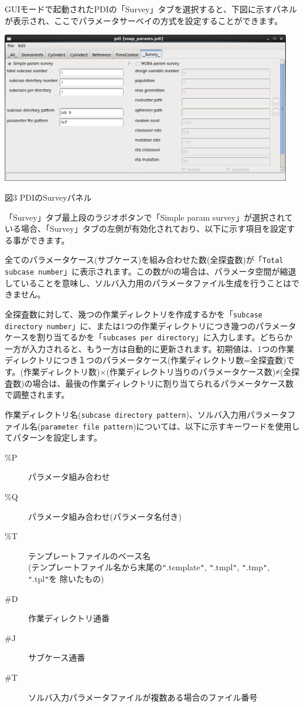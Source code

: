 \documentclass[a4paper,11pt]{jarticle}
\begin{document}
GUIモードで起動されたPDIの「Survey」タブを選択すると、下図に示すパネルが表示され、ここでパラメータサーベイの方式を設定することができます。

\begin{center}
\includegraphics[width=360pt, bb=0 0 984 511]{figs/fig002.png}

図3 PDIのSurveyパネル
\end{center}

「Survey」タブ最上段のラジオボタンで「Simple param survey」が選択されている場合、「Survey」タブの左側が有効化されており、以下に示す項目を設定する事ができます。

全てのパラメータケース(サブケース)を組み合わせた数(全探査数)が「{\tt Total subcase number}」に表示されます。この数が0の場合は、パラメータ空間が縮退していることを意味し、ソルバ入力用のパラメータファイル生成を行うことはできません。

全探査数に対して、幾つの作業ディレクトリを作成するかを「{\tt subcase directory number}」に、または1つの作業ディレクトリにつき幾つのパラメータケースを割り当てるかを「{\tt subcases per directory}」に入力します。どちらか一方が入力されると、もう一方は自動的に更新されます。初期値は、1つの作業ディレクトリにつき１つのパラメータケース(作業ディレクトリ数=全探査数)です。(作業ディレクトリ数)×(作業ディレクトリ当りのパラメータケース数)≠(全探査数)の場合は、最後の作業ディレクトリに割り当てられるパラメータケース数で調整されます。

作業ディレクトリ名({\tt subcase directory pattern})、ソルバ入力用パラメータファイル名({\tt parameter file pattern})については、以下に示すキーワードを使用してパターンを設定します。

\begin{description}
\item[\%P] パラメータ組み合わせ
\item[\%Q] パラメータ組み合わせ(パラメータ名付き)
\item[\%T] テンプレートファイルのベース名\\
(テンプレートファイル名から末尾の\texttt{"}.template\texttt{"}, 
\texttt{"}.tmpl\texttt{"}, \texttt{"}.tmp\texttt{"}, \texttt{"}.tpl\texttt{"}を 除いたもの)
\item[\#D] 作業ディレクトリ通番
\item[\#J] サブケース通番
\item[\#T] ソルバ入力パラメータファイルが複数ある場合のファイル番号
\end{description}
\end{document}
